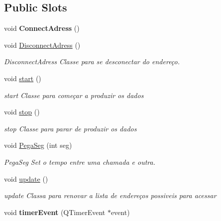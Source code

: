 \subsection*{Public Slots}
\begin{DoxyCompactItemize}
\item 
\mbox{\label{class_main_window_a3613ef775489a7934cbb2f2a0c241a74}} 
void {\bfseries Connect\+Adress} ()
\item 
\mbox{\label{class_main_window_a6d91a01cd024fa6141b888116b8fe7e9}} 
void \mbox{\hyperlink{class_main_window_a6d91a01cd024fa6141b888116b8fe7e9}{Disconnect\+Adress}} ()
\begin{DoxyCompactList}\small\item\em Disconnect\+Adress Classe para se desconectar do endereço. \end{DoxyCompactList}\item 
\mbox{\label{class_main_window_a5edcbc314e782645cdf4db101eeb247d}} 
void \mbox{\hyperlink{class_main_window_a5edcbc314e782645cdf4db101eeb247d}{start}} ()
\begin{DoxyCompactList}\small\item\em start Classe para começar a produzir os dados \end{DoxyCompactList}\item 
\mbox{\label{class_main_window_a939e90ddfe07d74be87b351ca2171fb0}} 
void \mbox{\hyperlink{class_main_window_a939e90ddfe07d74be87b351ca2171fb0}{stop}} ()
\begin{DoxyCompactList}\small\item\em stop Classe para parar de produzir os dados \end{DoxyCompactList}\item 
void \mbox{\hyperlink{class_main_window_a4fa75cec1aa7eeca94028dbcb58bbe14}{Pega\+Seg}} (int seg)
\begin{DoxyCompactList}\small\item\em Pega\+Seg Set o tempo entre uma chamada e outra. \end{DoxyCompactList}\item 
\mbox{\label{class_main_window_a128f71880d4b9683149023fc46fcc9f8}} 
void \mbox{\hyperlink{class_main_window_a128f71880d4b9683149023fc46fcc9f8}{update}} ()
\begin{DoxyCompactList}\small\item\em update Classa para renovar a lista de endereços possiveis para acessar \end{DoxyCompactList}\item 
\mbox{\label{class_main_window_aaa425b1554af3c1f58cc70b4815082ae}} 
void {\bfseries timer\+Event} (Q\+Timer\+Event $\ast$event)
\end{DoxyCompactItemize}
